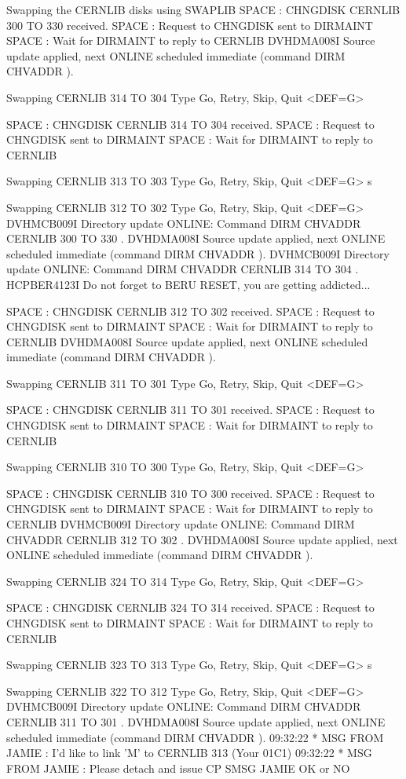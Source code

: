 \begin{XMPt}{Swapping the CERNLIB disks using SWAPLIB}
 SPACE : CHNGDISK CERNLIB 300 TO 330 received.
 SPACE : Request to CHNGDISK sent to DIRMAINT
 SPACE : Wait for DIRMAINT to reply to CERNLIB
 DVHDMA008I Source update applied, next ONLINE scheduled immediate (command
    DIRM CHVADDR ).
 
 Swapping CERNLIB 314 TO 304
 Type Go, Retry, Skip, Quit <DEF=G>
 
 SPACE : CHNGDISK CERNLIB 314 TO 304 received.
 SPACE : Request to CHNGDISK sent to DIRMAINT
 SPACE : Wait for DIRMAINT to reply to CERNLIB
 
 Swapping CERNLIB 313 TO 303
 Type Go, Retry, Skip, Quit <DEF=G>
 s
 
 Swapping CERNLIB 312 TO 302
 Type Go, Retry, Skip, Quit <DEF=G>
 DVHMCB009I Directory update ONLINE: Command DIRM CHVADDR CERNLIB 300 TO 330 .
 DVHDMA008I Source update applied, next ONLINE scheduled immediate (command
    DIRM CHVADDR ).
 DVHMCB009I Directory update ONLINE: Command DIRM CHVADDR CERNLIB 314 TO 304 .
 HCPBER4123I Do not forget to BERU RESET, you are getting addicted...
 
 SPACE : CHNGDISK CERNLIB 312 TO 302 received.
 SPACE : Request to CHNGDISK sent to DIRMAINT
 SPACE : Wait for DIRMAINT to reply to CERNLIB
 DVHDMA008I Source update applied, next ONLINE scheduled immediate (command
    DIRM CHVADDR ).
 
 Swapping CERNLIB 311 TO 301
 Type Go, Retry, Skip, Quit <DEF=G>
 
 SPACE : CHNGDISK CERNLIB 311 TO 301 received.
 SPACE : Request to CHNGDISK sent to DIRMAINT
 SPACE : Wait for DIRMAINT to reply to CERNLIB
 
 Swapping CERNLIB 310 TO 300
 Type Go, Retry, Skip, Quit <DEF=G>
 
 SPACE : CHNGDISK CERNLIB 310 TO 300 received.
 SPACE : Request to CHNGDISK sent to DIRMAINT
 SPACE : Wait for DIRMAINT to reply to CERNLIB
 DVHMCB009I Directory update ONLINE: Command DIRM CHVADDR CERNLIB 312 TO 302 .
 DVHDMA008I Source update applied, next ONLINE scheduled immediate (command
    DIRM CHVADDR ).
 
 Swapping CERNLIB 324 TO 314
 Type Go, Retry, Skip, Quit <DEF=G>
 
 SPACE : CHNGDISK CERNLIB 324 TO 314 received.
 SPACE : Request to CHNGDISK sent to DIRMAINT
 SPACE : Wait for DIRMAINT to reply to CERNLIB
 
 Swapping CERNLIB 323 TO 313
 Type Go, Retry, Skip, Quit <DEF=G>
 s
 
 Swapping CERNLIB 322 TO 312
 Type Go, Retry, Skip, Quit <DEF=G>
 DVHMCB009I Directory update ONLINE: Command DIRM CHVADDR CERNLIB 311 TO 301 .
 DVHDMA008I Source update applied, next ONLINE scheduled immediate (command
    DIRM CHVADDR ).
 09:32:22  * MSG FROM JAMIE   : I'd like to link 'M' to CERNLIB 313 (Your 01C1)
 09:32:22  * MSG FROM JAMIE   : Please detach and issue CP SMSG JAMIE OK or NO
 

\end{XMPt}
